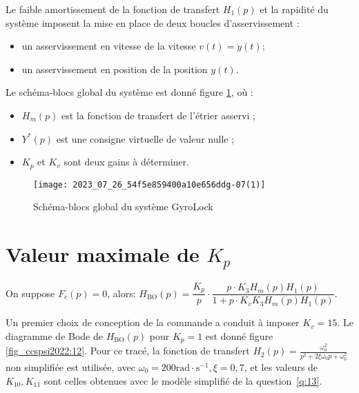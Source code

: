 Le faible amortissement de la fonction de transfert $H_{1}(p)$ et la rapidité du système imposent la mise en place de deux boucles d'asservissement :
\begin{itemize}
 \item  un asservissement en vitesse de la vitesse $v(t)=\dot{y}(t)$;
  \item un asservissement en position de la position $y(t)$.
\end{itemize}

Le schéma-blocs global du système est donné figure \ref{fig_ccspsi2022:11}, où :

\begin{itemize}
  \item $H_{m}(p)$ est la fonction de transfert de l'étrier asservi ;

  \item $Y^{*}(p)$ est une consigne virtuelle de valeur nulle ;

  \item $K_{p}$ et $K_{v}$ sont deux gains à déterminer.

\end{itemize}


\begin{figure}[!h]
\centering
\texttt{[image: 2023\_07\_26\_54f5e859400a10e656ddg-07(1)]}
\caption{\label{fig_ccspsi2022:11}Schéma-blocs global du système GyroLock}
\end{figure}

\section{\label{sec:III.A} Valeur maximale de $K_{p}$}
\ifprof
\begin{corrige}
On suppose $F_c(p) = 0$, alors: $\boxed{H_{\text{BO}}(p) = \dfrac{K_p}{p} \cdot \dfrac{p\cdot K_3 H_m(p) H_1(p)}{1+p\cdot K_vK_3 H_m(p) H_1(p)}}$. 
\end{corrige}
\else
\fi

Un premier choix de conception de la commande a conduit à imposer $K_{v}=15$. Le diagramme de Bode de $H_{\mathrm{BO}}(p)$ pour $K_{p}=1$ est donné figure \ref{fig_ccspsi2022:12}. Pour ce tracé, la fonction de transfert $H_{2}(p)=\frac{\omega_{0}^{2}}{p^{2}+2 \xi \omega_{0} p+\omega_{0}^{2}}$ non simplifiée est utilisée, avec $\omega_{0}=200 \mathrm{rad} \cdot \mathrm{s}^{-1}, \xi=0,7$, et les valeurs de $K_{10}, K_{11}$ sont celles obtenues avec le modèle simplifié de la question~\ref{q:13}.


